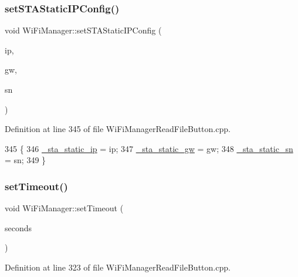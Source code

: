 \subsubsection{\texorpdfstring{set\+S\+T\+A\+Static\+I\+P\+Config()}{setSTAStaticIPConfig()}}
{\footnotesize\ttfamily void Wi\+Fi\+Manager\+::set\+S\+T\+A\+Static\+I\+P\+Config (\begin{DoxyParamCaption}\item[{I\+P\+Address}]{ip,  }\item[{I\+P\+Address}]{gw,  }\item[{I\+P\+Address}]{sn }\end{DoxyParamCaption})}



Definition at line 345 of file Wi\+Fi\+Manager\+Read\+File\+Button.\+cpp.


\begin{DoxyCode}
345                                                                                \{
346   \hyperlink{class_wi_fi_manager_ad90d356096742a43b4540117b92faff0}{\_sta\_static\_ip} = ip;
347   \hyperlink{class_wi_fi_manager_a36648ca4819dc0feedaf9e1987d56d96}{\_sta\_static\_gw} = gw;
348   \hyperlink{class_wi_fi_manager_a3fd337255bce688189f9d450cc0ca3a3}{\_sta\_static\_sn} = sn;
349 \}
\end{DoxyCode}
\mbox{\label{class_wi_fi_manager_aa6493d59c284ff245edb767ff684756d}} 
\subsubsection{\texorpdfstring{set\+Timeout()}{setTimeout()}}
{\footnotesize\ttfamily void Wi\+Fi\+Manager\+::set\+Timeout (\begin{DoxyParamCaption}\item[{unsigned long}]{seconds }\end{DoxyParamCaption})}



Definition at line 323 of file Wi\+Fi\+Manager\+Read\+File\+Button.\+cpp.


